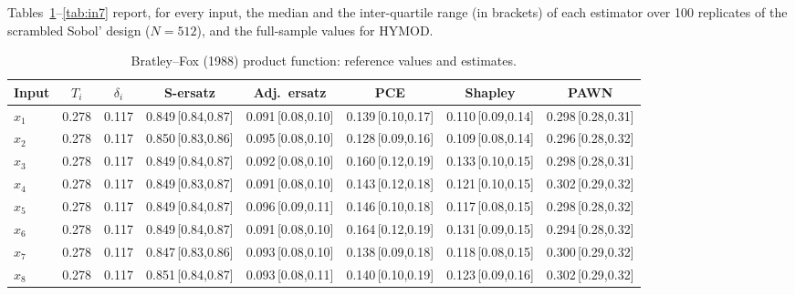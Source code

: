 \documentclass[11pt,a4paper]{article}
\begin{document}
Tables~\ref{tab:in1}--\ref{tab:in7} report, for every input, the median and the inter-quartile range (in brackets) of each estimator over 100 replicates of the scrambled Sobol' design ($N=512$), and the full-sample values for HYMOD.
\begin{table}[H]\centering\footnotesize
\begin{tabular}{@{}lccccccc@{}}\toprule
Input & $T_i$ & $\delta_i$ & S-ersatz & Adj.\ ersatz & PCE & Shapley & PAWN \\ \midrule
$x_{1}$ & 0.278 & 0.117 & 0.849\,{\scriptsize[0.84,0.87]} & 0.091\,{\scriptsize[0.08,0.10]} & 0.139\,{\scriptsize[0.10,0.17]} & 0.110\,{\scriptsize[0.09,0.14]} & 0.298\,{\scriptsize[0.28,0.31]} \\
$x_{2}$ & 0.278 & 0.117 & 0.850\,{\scriptsize[0.83,0.86]} & 0.095\,{\scriptsize[0.08,0.10]} & 0.128\,{\scriptsize[0.09,0.16]} & 0.109\,{\scriptsize[0.08,0.14]} & 0.296\,{\scriptsize[0.28,0.32]} \\
$x_{3}$ & 0.278 & 0.117 & 0.849\,{\scriptsize[0.84,0.87]} & 0.092\,{\scriptsize[0.08,0.10]} & 0.160\,{\scriptsize[0.12,0.19]} & 0.133\,{\scriptsize[0.10,0.15]} & 0.298\,{\scriptsize[0.28,0.31]} \\
$x_{4}$ & 0.278 & 0.117 & 0.849\,{\scriptsize[0.83,0.87]} & 0.091\,{\scriptsize[0.08,0.10]} & 0.143\,{\scriptsize[0.12,0.18]} & 0.121\,{\scriptsize[0.10,0.15]} & 0.302\,{\scriptsize[0.29,0.32]} \\
$x_{5}$ & 0.278 & 0.117 & 0.849\,{\scriptsize[0.84,0.87]} & 0.096\,{\scriptsize[0.09,0.11]} & 0.146\,{\scriptsize[0.10,0.18]} & 0.117\,{\scriptsize[0.08,0.15]} & 0.298\,{\scriptsize[0.28,0.32]} \\
$x_{6}$ & 0.278 & 0.117 & 0.849\,{\scriptsize[0.84,0.87]} & 0.091\,{\scriptsize[0.08,0.10]} & 0.164\,{\scriptsize[0.12,0.19]} & 0.131\,{\scriptsize[0.09,0.15]} & 0.294\,{\scriptsize[0.28,0.32]} \\
$x_{7}$ & 0.278 & 0.117 & 0.847\,{\scriptsize[0.83,0.86]} & 0.093\,{\scriptsize[0.08,0.10]} & 0.138\,{\scriptsize[0.09,0.18]} & 0.118\,{\scriptsize[0.08,0.15]} & 0.300\,{\scriptsize[0.29,0.32]} \\
$x_{8}$ & 0.278 & 0.117 & 0.851\,{\scriptsize[0.84,0.87]} & 0.093\,{\scriptsize[0.08,0.11]} & 0.140\,{\scriptsize[0.10,0.19]} & 0.123\,{\scriptsize[0.09,0.16]} & 0.302\,{\scriptsize[0.29,0.32]} \\
\bottomrule\end{tabular}
\caption{Bratley--Fox (1988) product function: reference values and estimates.}
\label{tab:in1}
\end{table}
\end{document}
